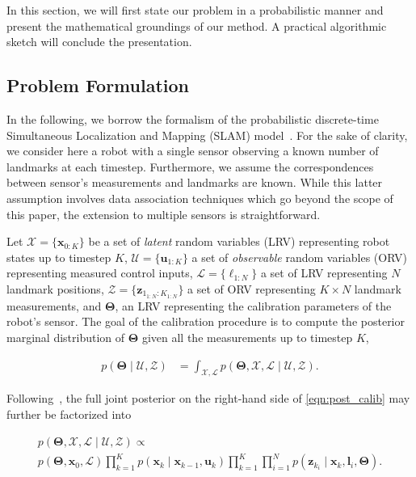 In this section, we will first state our problem in a probabilistic manner and
present the mathematical groundings of our method. A practical algorithmic
sketch will conclude the presentation.

\subsection{Problem Formulation\label{subsec:prob}}

In the following, we borrow the formalism of the probabilistic discrete-time
Simultaneous Localization and Mapping (SLAM)
model~\cite{durrantwhyte06simultaneous}. For the sake of clarity, we
consider here a robot with a single sensor observing a known number of landmarks
at each timestep. Furthermore, we assume the correspondences between sensor's
measurements and landmarks are known. While this latter assumption involves data
association techniques which go beyond the scope of this paper, the extension to
multiple sensors is straightforward.

Let
$\mathcal{X}=\{\mathbf{x}_{0:K}\}$ be a set of \emph{latent} random variables
(LRV) representing robot states up to timestep $K$,
$\mathcal{U}=\{\mathbf{u}_{1:K}\}$ a set of \emph{observable} random variables
(ORV) representing measured control inputs,
$\mathcal{L}=\{\boldsymbol{\ell}_{1:N}\}$ a set of LRV representing $N$
landmark positions, $\mathcal{Z}=\{\mathbf{z}_{1_{1:N}:K_{1:N}}\}$ a set of ORV
representing $K \times N$ landmark measurements, and $\boldsymbol{\Theta}$, an
LRV representing the calibration parameters of the robot's sensor. The goal of
the calibration procedure is to compute the posterior marginal distribution of
$\boldsymbol{\Theta}$ given all the measurements up to timestep $K$,

\begin{equation}\label{eqn:post_calib}
  \begin{aligned}
  p(\boldsymbol{\Theta}\mid\mathcal{U},\mathcal{Z}) &=
    \int_{\mathcal{X}, \mathcal{L}}p(\boldsymbol{\Theta}, \mathcal{X},
    \mathcal{L} \mid\mathcal{U},\mathcal{Z}).
  \end{aligned}
\end{equation}

\noindent Following~\cite{durrantwhyte06simultaneous}, the full joint posterior
on the right-hand side of \eqref{eqn:post_calib} may further be factorized into

\begin{multline}\label{eqn:post_joint_factorized}
  p(\boldsymbol{\Theta}, \mathcal{X},
    \mathcal{L} \mid\mathcal{U},\mathcal{Z}) \propto\\
    p(\boldsymbol{\Theta}, \mathbf{x}_0,\mathcal{L})
    \prod_{k=1}^K p(\mathbf{x}_k\mid\mathbf{x}_{k - 1},\mathbf{u}_k)
    \prod_{k=1}^K\prod_{i=1}^N p(\mathbf{z}_{k_i}\mid\mathbf{x}_k,
    \mathbf{l}_i,\boldsymbol{\Theta}).
\end{multline}

